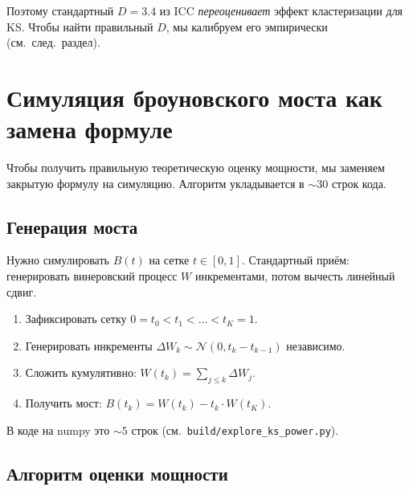 \documentclass[11pt]{article}
\begin{document}
Поэтому стандартный $D = 3.4$ из ICC \emph{переоценивает} эффект кластеризации для KS. Чтобы найти правильный $D$, мы калибруем его эмпирически (см.\ след.\ раздел).

\section{Симуляция броуновского моста как замена формуле}

Чтобы получить правильную теоретическую оценку мощности, мы заменяем закрытую формулу на симуляцию. Алгоритм укладывается в $\sim 30$ строк кода.

\subsection{Генерация моста}

Нужно симулировать $B(t)$ на сетке $t \in [0,1]$. Стандартный приём: генерировать винеровский процесс $W$ инкрементами, потом вычесть линейный сдвиг.

\begin{enumerate}[leftmargin=2em, itemsep=2pt]
\item Зафиксировать сетку $0 = t_0 < t_1 < \ldots < t_K = 1$.
\item Генерировать инкременты $\Delta W_k \sim \mathcal{N}(0, t_k - t_{k-1})$ независимо.
\item Сложить кумулятивно: $W(t_k) = \sum_{j \leq k} \Delta W_j$.
\item Получить мост: $B(t_k) = W(t_k) - t_k \cdot W(t_K)$.
\end{enumerate}

В коде на numpy это $\sim 5$ строк (см.\ \texttt{build/explore\_ks\_power.py}).

\subsection{Алгоритм оценки мощности}
\end{document}
